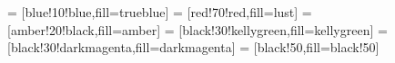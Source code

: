

 = [blue!10!blue,fill=trueblue]
 = [red!70!red,fill=lust]
 = [amber!20!black,fill=amber]
 = [black!30!kellygreen,fill=kellygreen]
 = [black!30!darkmagenta,fill=darkmagenta]
 = [black!50,fill=black!50]
